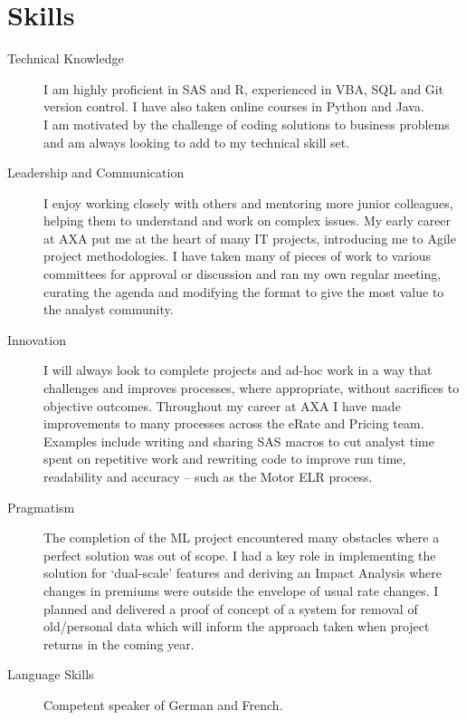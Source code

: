 \documentclass[11pt]{article}
\begin{document}
\section*{Skills}
\begin{description}

\item[Technical Knowledge] I am highly proficient in SAS and R, experienced in VBA, SQL and Git version control. I have also taken online courses in Python and Java. \\
I am motivated by the challenge of coding solutions to business problems and am always looking to add to my technical skill set.

\item[Leadership and Communication] I enjoy working closely with others and mentoring more junior colleagues, helping them to understand and work on complex issues. My early career at AXA put me at the heart of many IT projects, introducing me to Agile project methodologies. I have taken many of pieces of work to various committees for approval or discussion and ran my own regular meeting, curating the agenda and modifying the format to give the most value to the analyst community.

\item[Innovation] I will always look to complete projects and ad-hoc work in a way that challenges and improves processes, where appropriate, without sacrifices to objective outcomes. Throughout my career at AXA I have made improvements to many processes across the eRate and Pricing team. Examples include  writing and sharing SAS macros to cut analyst time spent on repetitive work and rewriting code to improve run time, readability and accuracy -- such as the Motor ELR process.

\item[Pragmatism] The completion of the ML project encountered many obstacles where a perfect solution was out of scope. I had a key role in implementing the solution for `dual-scale' features and deriving an Impact Analysis where changes in premiums were outside the envelope of usual rate changes. I planned and delivered a proof of concept of a system for removal of old/personal data which will inform the approach taken when project returns in the coming year.

\item[Language Skills] Competent speaker of German and French.

\end{description} 
\end{document}
